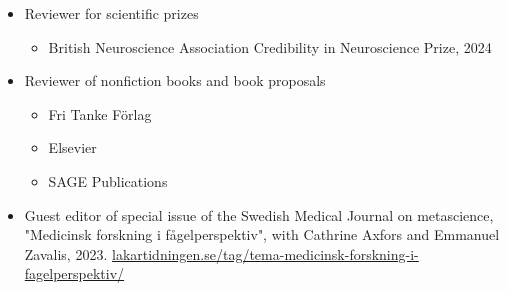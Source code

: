 \documentclass[10pt,a4paper,twocolumn]{article}
\begin{document}
\begin{itemize}
\begin{itemize}
    
    \end{itemize}
    
    

    \item Reviewer for scientific prizes
    
    \begin{itemize}
    
        
        \item British Neuroscience Association Credibility in Neuroscience Prize, 2024
        
    
    \end{itemize}
    
    

    \item Reviewer of nonfiction books and book proposals
    
    \begin{itemize}
    
        
        \item Fri Tanke Förlag
        
    
        
        \item Elsevier
        
    
        
        \item SAGE Publications
        
    
    \end{itemize}
    
    

    \item Guest editor of special issue of the Swedish Medical Journal on metascience, "Medicinsk forskning i fågelperspektiv", with Cathrine Axfors and Emmanuel Zavalis, 2023. \href{https://lakartidningen.se/tag/tema-medicinsk-forskning-i-fagelperspektiv/}{lakartidningen.se/tag/tema-medicinsk-forskning-i-fagelperspektiv/}
    
    

\end{itemize}


\end{document}

